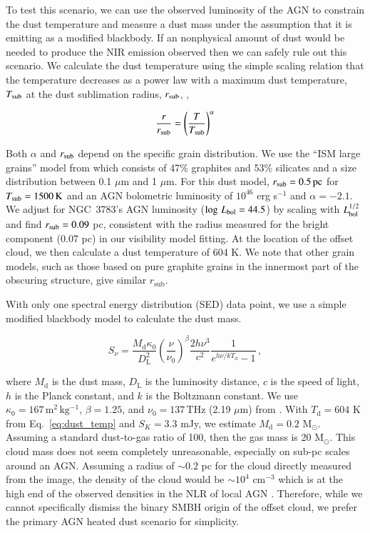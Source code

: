 \documentclass[longauth,]{aa}
\newcommand{\micron}{{\mbox{$\mu$m}}}
\begin{document}
To test this scenario, we can use the observed luminosity of the AGN to constrain the dust temperature and measure a dust mass under the assumption that it is emitting as a modified blackbody. If an nonphysical amount of dust would be needed to produce the NIR emission observed then we can safely rule out this scenario. We calculate the dust temperature using the simple scaling relation that the temperature decreases as a power law with a maximum dust temperature, $T_{\rm sub}$ at the dust sublimation radius, $r_{\rm sub}$, \citep[e.g.][]{Honig:2010lr},

\begin{equation}\label{eq:dust_temp}
\frac{r}{r_{\rm sub}} = \left(\frac{T}{T_{\rm sub}}\right)^{\alpha}
\end{equation}

\noindent Both $\alpha$ and $r_{\rm sub}$ depend on the specific grain distribution. We use the ``ISM large grains'' model from \citet{Honig:2010lr} which consists of 47\% graphites and 53\% silicates and a \citet{Mathis:1977aa} size distribution between 0.1 \micron{} and 1 \micron{}. For this dust model, $r_{\rm sub} = 0.5\,\rm{pc}$ for $T_{\rm sub}=1500\,\rm{K}$ and an AGN bolometric luminosity of $10^{46}$ erg s$^{-1}$ and $\alpha = -2.1$. We adjust for NGC~3783's AGN luminosity ($\log\,L_{\rm bol} = 44.5$) by scaling with $L_{\rm bol}^{1/2}$ and find $r_{\rm sub} = 0.09$ pc, consistent with the radius measured for the bright component (0.07 pc) in our visibility model fitting. At the location of the offset cloud, we then calculate a dust temperature of 604 K. We note that other grain models, such as those based on pure graphite grains in the innermost part of the obscuring structure, give similar $r_\mathrm{sub}$.

With only one spectral energy distribution (SED) data point, we use a simple modified blackbody model to calculate the dust mass.

\begin{equation}\label{eq:mod_bb}
S_{\nu} = \frac{M_{\mathrm{d}}\kappa_{0}}{D_{\mathrm{L}}^2}\left(\frac{\nu}{\nu_{0}}\right)^{\beta}\frac{2h\nu^{3}}{c^{2}}\frac{1}{e^{{h\nu/kT_{\mathrm{d}}}}-1}\,,
\end{equation}

\noindent where $M_{\mathrm{d}}$ is the dust mass, $D_{\mathrm{L}}$ is the luminosity distance, $c$ is the speed of light, $h$ is the Planck constant, and $k$ is the Boltzmann constant. We use $\kappa_{0}=167\,\mathrm{m^{2}\,kg^{-1}}$, $\beta=1.25$, and $\nu_{0}=137\,\mathrm{THz}$ (2.19 \micron) from \citet{Draine:2003gd}. With $T_{\mathrm{d}} = 604$ K from Eq.~\ref{eq:dust_temp} and $S_{K} = 3.3$ mJy, we estimate $M_{\mathrm{d}} = 0.2$ M$_{\odot}$. Assuming a standard dust-to-gas ratio of 100, then the gas mass is 20 M$_{\odot}$. This cloud mass does not seem completely unreasonable, especially on sub-pc scales around an AGN. Assuming a radius of $\sim0.2$ pc for the cloud directly measured from the image, the density of the cloud would be $\sim10^4$ cm$^{-3}$ which is at the high end of the observed densities in the NLR of local AGN \citep{Davies:2020aa}. Therefore, while we cannot specifically dismiss the binary SMBH origin of the offset cloud, we prefer the primary AGN heated dust scenario for simplicity.
\end{document}
